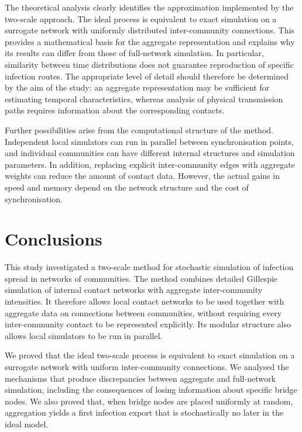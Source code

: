 \documentclass{ieeeaccess}
\begin{document}
The theoretical analysis clearly identifies the approximation implemented by the two-scale approach. The ideal process is equivalent to exact simulation on a surrogate network with uniformly distributed inter-community connections. This provides a mathematical basis for the aggregate representation and explains why its results can differ from those of full-network simulation. In particular, similarity between time distributions does not guarantee reproduction of specific infection routes. The appropriate level of detail should therefore be determined by the aim of the study: an aggregate representation may be sufficient for estimating temporal characteristics, whereas analysis of physical transmission paths requires information about the corresponding contacts.

Further possibilities arise from the computational structure of the method. Independent local simulators can run in parallel between synchronisation points, and individual communities can have different internal structures and simulation parameters. In addition, replacing explicit inter-community edges with aggregate weights can reduce the amount of contact data. However, the actual gains in speed and memory depend on the network structure and the cost of synchronisation.

\section{Conclusions}
\label{sec:conclusions}

This study investigated a two-scale method for stochastic simulation of infection spread in networks of communities. The method combines detailed Gillespie simulation of internal contact networks with aggregate inter-community intensities. It therefore allows local contact networks to be used together with aggregate data on connections between communities, without requiring every inter-community contact to be represented explicitly. Its modular structure also allows local simulators to be run in parallel.

We proved that the ideal two-scale process is equivalent to exact simulation on a surrogate network with uniform inter-community connections. We analysed the mechanisms that produce discrepancies between aggregate and full-network simulation, including the consequences of losing information about specific bridge nodes. We also proved that, when bridge nodes are placed uniformly at random, aggregation yields a first infection export that is stochastically no later in the ideal model.
\end{document}
